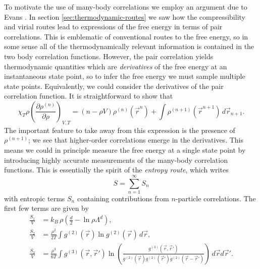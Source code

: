 To motivate the use of many-body correlations we employ an argument due to Evans \cite{EvansPrivate2019}.
In section \ref{sec:thermodynamic-routes} we saw how the compressibility and virial routes lead to expressions of the free energy in terms of pair correlations.
This is emblematic of conventional routes to the free energy, so in some sense all of the thermodynamically relevant information is contained in the two body correlation functions.
However, the pair correlation yields thermodynamic quantities which are \emph{derivatives} of the free energy at an instantaneous state point, so to infer the free energy we must sample multiple state points.
Equivalently, we could consider the derivatives of the pair correlation function.
It is straightforward to show that \cite{Santos2016}
\begin{equation}\label{eq:correlation-derivatives}
  \chi_T \rho
  \left( \frac{\partial \rho^{(n)}}{\partial \rho} \right)_{V,T}
  =
  (n - \rho V) \rho^{(n)}(\vec{r}^n)
  + \int \rho^{(n+1)}(\vec{r}^{n+1}) \, d\vec{r}_{n+1}.
\end{equation}
The important feature to take away from this expression is the presence of $\rho^{(n+1)}$; we see that higher-order correlations emerge in the derivatives.
This means we could in principle measure the free energy at a single state point by introducing highly accurate measurements of the many-body correlation functions.
This is essentially the spirit of the \emph{entropy route}, which writes \cite{WallaceJCP1987}
\begin{equation}
  S = \sum_{n=1}^\infty S_n
\end{equation}
with entropic terms $S_n$ containing contributions from $n$-particle correlations.
The first few terms are given by \cite{WallaceJCP1987}
\begin{subequations}
  \begin{align}
    \frac{S_1}{V}%
    &=
    k_B \, \rho \left( \frac{d}{2} - \ln{\rho \Lambda^d} \right),
    \\
    \frac{S_2}{V}%
    &=
    \frac{\rho^2}{2 T}
    \int g^{(2)}(\vec{r}) \ln{g^{(2)}(\vec{r})}
    \, d\vec{r},
    \\
    \frac{S_3}{V}%
    &=
    \frac{\rho^3}{6 T}
    \int g^{(3)}(\vec{r}, \vec{r}')
    \ln{\left(
      \frac{
        g^{(3)}(\vec{r}, \vec{r}')
      }{
        g^{(2)}(\vec{r}) g^{(2)}(\vec{r}') g^{(2)}(\vec{r} - \vec{r}')
      }
      \right)}
    \, d\vec{r} d\vec{r}'.
  \end{align}
\end{subequations}

